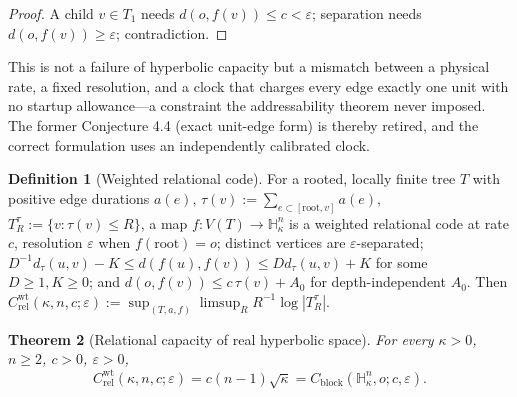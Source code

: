 \documentclass[11pt,reqno]{amsart}
\theoremstyle{plain}
\newtheorem{theorem}{Theorem}[section]
\theoremstyle{definition}
\newtheorem{definition}[theorem]{Definition}
\newcommand{\Crel}{C_{\mathrm{rel}}}
\newcommand{\Cblock}{C_{\mathrm{block}}}
\newcommand{\Hk}{\mathbb{H}^n_\kappa}
\newcommand{\eps}{\varepsilon}
\begin{document}
\begin{proof}
A child $v\in T_1$ needs $d(o,f(v))\le c<\eps$; separation needs $d(o,f(v))\ge\eps$; contradiction.
\end{proof}

This is not a failure of hyperbolic capacity but a mismatch between a physical rate, a fixed resolution, and a clock that charges every edge exactly one unit with no startup allowance---a constraint the addressability theorem never imposed. The former Conjecture 4.4 (exact unit-edge form) is thereby retired, and the correct formulation uses an independently calibrated clock.

\begin{definition}[Weighted relational code]
For a rooted, locally finite tree $T$ with positive edge durations $a(e)$, $\tau(v):=\sum_{e\subset[\mathrm{root},v]}a(e)$, $T_R^\tau:=\{v:\tau(v)\le R\}$, a map $f:V(T)\to\Hk$ is a weighted relational code at rate $c$, resolution $\eps$ when $f(\mathrm{root})=o$; distinct vertices are $\eps$-separated; $D^{-1}d_\tau(u,v)-K\le d(f(u),f(v))\le Dd_\tau(u,v)+K$ for some $D\ge1,K\ge0$; and $d(o,f(v))\le c\,\tau(v)+A_0$ for depth-independent $A_0$. Then $\Crel^{\mathrm{wt}}(\kappa,n,c;\eps):=\sup_{(T,a,f)}\limsup_R R^{-1}\log|T_R^\tau|$.
\end{definition}

\begin{theorem}[Relational capacity of real hyperbolic space]\label{thm:relational}
For every $\kappa>0$, $n\ge2$, $c>0$, $\eps>0$,
\[
\Crel^{\mathrm{wt}}(\kappa,n,c;\eps)=c(n-1)\sqrt\kappa=\Cblock(\Hk,o;c,\eps).
\]
\end{theorem}
\end{document}
